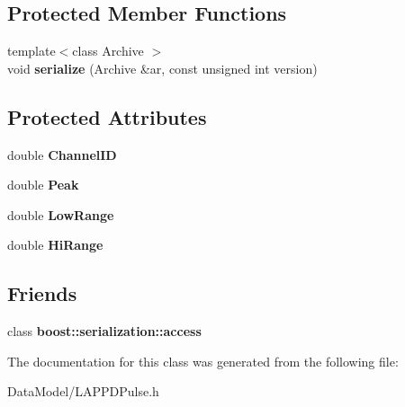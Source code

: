 \subsection*{Protected Member Functions}
\begin{DoxyCompactItemize}
\item 
\hypertarget{classLAPPDPulse_ab020ca8809cf6818295f23935326f144}{
{\footnotesize template$<$class Archive $>$ }\\void {\bfseries serialize} (Archive \&ar, const unsigned int version)}
\label{classLAPPDPulse_ab020ca8809cf6818295f23935326f144}

\end{DoxyCompactItemize}
\subsection*{Protected Attributes}
\begin{DoxyCompactItemize}
\item 
\hypertarget{classLAPPDPulse_a2e42975bd2fd735b7bd7d7c2bacb683f}{
double {\bfseries ChannelID}}
\label{classLAPPDPulse_a2e42975bd2fd735b7bd7d7c2bacb683f}

\item 
\hypertarget{classLAPPDPulse_a72893cf5f3accbe429e2cb1437b02064}{
double {\bfseries Peak}}
\label{classLAPPDPulse_a72893cf5f3accbe429e2cb1437b02064}

\item 
\hypertarget{classLAPPDPulse_af4923695ff523930e7109fab7743d7c4}{
double {\bfseries LowRange}}
\label{classLAPPDPulse_af4923695ff523930e7109fab7743d7c4}

\item 
\hypertarget{classLAPPDPulse_a5ee5c47716e498114b8924a64a92b562}{
double {\bfseries HiRange}}
\label{classLAPPDPulse_a5ee5c47716e498114b8924a64a92b562}

\end{DoxyCompactItemize}
\subsection*{Friends}
\begin{DoxyCompactItemize}
\item 
\hypertarget{classLAPPDPulse_ac98d07dd8f7b70e16ccb9a01abf56b9c}{
class {\bfseries boost::serialization::access}}
\label{classLAPPDPulse_ac98d07dd8f7b70e16ccb9a01abf56b9c}

\end{DoxyCompactItemize}


The documentation for this class was generated from the following file:\begin{DoxyCompactItemize}
\item 
DataModel/LAPPDPulse.h\end{DoxyCompactItemize}
